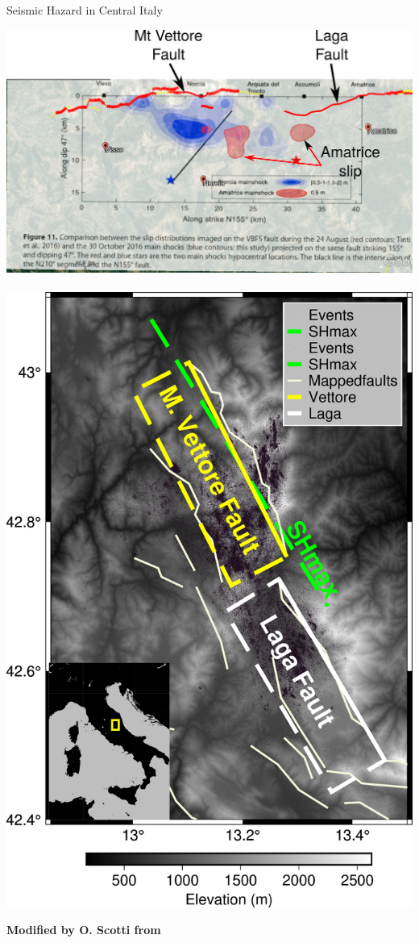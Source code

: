 \documentclass{beamer}
\begin{document}
\begin{frame}
 {Seismic Hazard in Central Italy}
 
 \begin{center}
    \includegraphics[width=0.65\linewidth]{images/amatrice_2.pdf} \,
    \includegraphics[width=0.3\linewidth]{images/map_italy.png}  
 \end{center}
  \vskip 0.2cm
  {\bf \hfill \scriptsize Modified by O. Scotti from \cite{Scognamiglio_2018_CFG}}
  \addtocounter{framenumber}{-1}
  
\end{frame}
\end{document}
